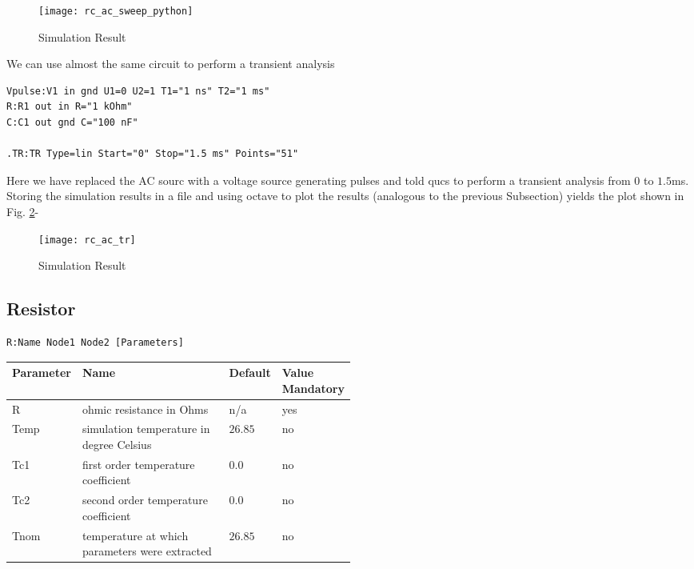 \begin{figure}[h]
\begin{center}
  \texttt{[image: rc\_ac\_sweep\_python]}
  \caption{Simulation Result}
  \label{plot:rc_ac_python}
\end{center}
\end{figure}






We can use almost the same circuit to perform a transient analysis

\begin{verbatim}
Vpulse:V1 in gnd U1=0 U2=1 T1="1 ns" T2="1 ms"
R:R1 out in R="1 kOhm"
C:C1 out gnd C="100 nF"

.TR:TR Type=lin Start="0" Stop="1.5 ms" Points="51"
\end{verbatim}

Here we have replaced the AC sourc with a voltage source generating pulses and told qucs to perform a transient analysis from $0$ to $1.5$ms. Storing the simulation results in a file and using octave to plot the results (analogous to the previous Subsection) yields the plot shown in Fig. \ref{plot:rc_ac_tr}-

\begin{figure}[h]
\begin{center}
  \texttt{[image: rc\_ac\_tr]}
  \caption{Simulation Result}
  \label{plot:rc_ac_tr}
\end{center}
\end{figure}



\label{chap:devices}


\subsection{Resistor}

\begin{verbatim}
R:Name Node1 Node2 [Parameters]
\end{verbatim}


\begin{tabular}{|l|p{0.5\linewidth}|l|l|}
\hline
Parameter & Name & Default & Value Mandatory \\
\hline
R & ohmic resistance in Ohms & n/a & yes \\
Temp & simulation temperature in degree Celsius & $26.85$ & no \\
Tc1 & first order temperature coefficient & $0.0$ & no \\
Tc2 & second order temperature coefficient & $0.0$ & no \\
Tnom & temperature at which parameters were extracted & $26.85$ & no \\
\hline
\end{tabular}



